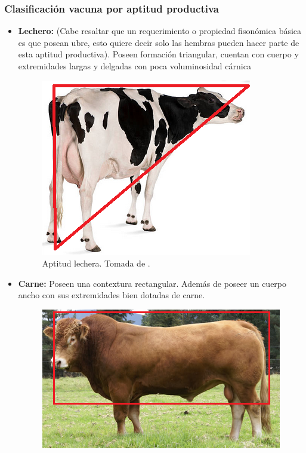 
\subsubsection{Clasificación vacuna por aptitud productiva}
\begin{itemize}
\item \textbf{Lechero:} (Cabe resaltar que un requerimiento o propiedad fisonómica básica es que posean ubre, esto quiere decir solo las hembras pueden hacer parte de esta aptitud productiva). Poseen formación triangular, cuentan con cuerpo y extremidades largas y delgadas con poca voluminosidad cárnica
\begin{figure}[H]
 \begin{center}
 \includegraphics[scale=0.75]{img/dibujito2.png}
 \end{center}
 \caption{Aptitud lechera. Tomada de \cite{googlepics}. }
\end{figure}
\item \textbf{Carne:} Poseen una contextura rectangular. Además de poseer un cuerpo ancho con sus extremidades bien dotadas de carne.
\begin{figure}[H]
 \begin{center}
 \includegraphics[scale=0.75]{img/dibujito3.png}

\end{center}
\end{figure}
\end{itemize}
